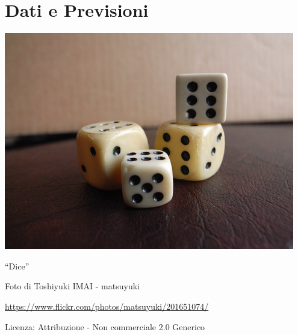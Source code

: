 \part{Dati e Previsioni}

\includegraphics[width=0.95\textwidth]{img/dadi.jpg}
  \begin{center}
    {\large ``Dice''}\par
    Foto di Toshiyuki IMAI - matsuyuki\par
    \url{https://www.flickr.com/photos/matsuyuki/201651074/}\par
    Licenza: Attribuzione - Non commerciale 2.0 Generico\par
  \end{center}
\clearpage
\cleardoublepage
